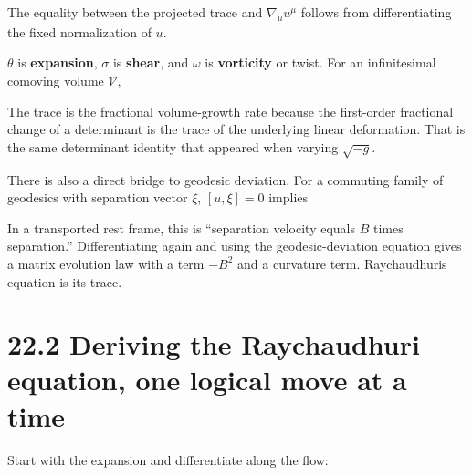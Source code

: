 \documentclass[
  11pt,
  letterpaper,
  oneside,
  openany]{scrbook}
\begin{document}
The equality between the projected trace and \(\nabla_\mu u^\mu\)
follows from differentiating the fixed normalization of \(u\).

\(\theta\) is \textbf{expansion}, \(\sigma\) is \textbf{shear}, and
\(\omega\) is \textbf{vorticity} or twist. For an infinitesimal comoving
volume \(\mathcal V\),

\begin{center}
\begingroup
{}
\ifdim\wd\grmathbox>\linewidth
\resizebox{\linewidth}{!}{\usebox{\grmathbox}}
\else\usebox{\grmathbox}\fi
\endgroup
\end{center}

The trace is the fractional volume-growth rate because the first-order
fractional change of a determinant is the trace of the underlying linear
deformation. That is the same determinant identity that appeared when
varying \(\sqrt{-g}\).

There is also a direct bridge to geodesic deviation. For a commuting
family of geodesics with separation vector \(\xi\), \([u,\xi]=0\)
implies

\begin{center}
\begingroup
{}
\ifdim\wd\grmathbox>\linewidth
\resizebox{\linewidth}{!}{\usebox{\grmathbox}}
\else\usebox{\grmathbox}\fi
\endgroup
\end{center}

In a transported rest frame, this is ``separation velocity equals \(B\)
times separation.'' Differentiating again and using the
geodesic-deviation equation gives a matrix evolution law with a term
\(-B^2\) and a curvature term. Raychaudhuri\textquotesingle s equation
is its trace.

\hypertarget{deriving-the-raychaudhuri-equation-one-logical-move-at-a-time}{%
\section{22.2 Deriving the Raychaudhuri equation, one logical move at a
time}\label{deriving-the-raychaudhuri-equation-one-logical-move-at-a-time}}

Start with the expansion and differentiate along the flow:

\begin{center}
\begingroup
{}
\ifdim\wd\grmathbox>\linewidth
\resizebox{\linewidth}{!}{\usebox{\grmathbox}}
\else\usebox{\grmathbox}\fi
\endgroup
\end{center}
\end{document}
